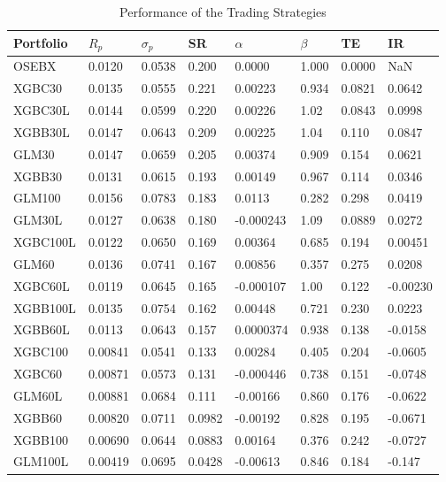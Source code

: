 \begin{table}[H]
\centering
\begin{tabularx}{\textwidth}{Xlllllll}
\toprule
Portfolio & $R_p$ & $\sigma_p$ & SR & $\alpha$ & $\beta$ & TE & IR \\
\midrule
OSEBX & 0.0120 & 0.0538 & 0.200 & 0.0000 & 1.000 & 0.0000 & NaN \\
\midrule
XGBC30 & 0.0135 & 0.0555 & \cellcolor{lightlightgreen}0.221 & 0.00223 & 0.934 & 0.0821 & 0.0642 \\
XGBC30L & 0.0144 & 0.0599 & 0.220 & 0.00226 & 1.02 & 0.0843 & 0.0998 \\
XGBB30L & 0.0147 & 0.0643 & 0.209 & 0.00225 & 1.04 & 0.110 & 0.0847 \\
GLM30 & 0.0147 & 0.0659 & 0.205 & 0.00374 & 0.909 & 0.154 & 0.0621 \\
XGBB30 & 0.0131 & 0.0615 & 0.193 & 0.00149 & 0.967 & 0.114 & 0.0346 \\
GLM100 & 0.0156 & 0.0783 & 0.183 & 0.0113 & 0.282 & 0.298 & 0.0419 \\
GLM30L & 0.0127 & 0.0638 & 0.180 & -0.000243 & 1.09 & 0.0889 & 0.0272 \\
XGBC100L & 0.0122 & 0.0650 & 0.169 & 0.00364 & 0.685 & 0.194 & 0.00451 \\
GLM60 & 0.0136 & 0.0741 & 0.167 & 0.00856 & 0.357 & 0.275 & 0.0208 \\
XGBC60L & 0.0119 & 0.0645 & 0.165 & -0.000107 & 1.00 & 0.122 & -0.00230 \\
XGBB100L & 0.0135 & 0.0754 & 0.162 & 0.00448 & 0.721 & 0.230 & 0.0223 \\
XGBB60L & 0.0113 & 0.0643 & 0.157 & 0.0000374 & 0.938 & 0.138 & -0.0158 \\
XGBC100 & 0.00841 & 0.0541 & 0.133 & 0.00284 & 0.405 & 0.204 & -0.0605 \\
XGBC60 & 0.00871 & 0.0573 & 0.131 & -0.000446 & 0.738 & 0.151 & -0.0748 \\
GLM60L & 0.00881 & 0.0684 & 0.111 & -0.00166 & 0.860 & 0.176 & -0.0622 \\
XGBB60 & 0.00820 & 0.0711 & 0.0982 & -0.00192 & 0.828 & 0.195 & -0.0671 \\
XGBB100 & 0.00690 & 0.0644 & 0.0883 & 0.00164 & 0.376 & 0.242 & -0.0727 \\
GLM100L & 0.00419 & 0.0695 & 0.0428 & -0.00613 & 0.846 & 0.184 & -0.147 \\
\bottomrule
\end{tabularx}
\vspace{1em}
\caption{Performance of the Trading Strategies}
\label{tab:new-performance-trading-return-sigma-sharpe-alpha-beta-te-ir}
\end{table}



